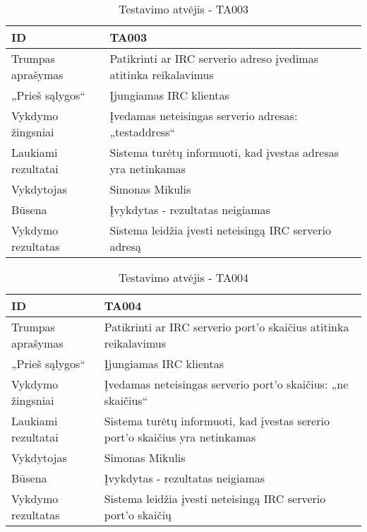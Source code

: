 \begin{table}[]
  \centering
  \label{table:TA003}
  \begin{tabular}{|l|l|}
    \hline
    ID                  & TA003                                                                         \\ \hline
    Trumpas aprašymas   & Patikrinti ar IRC serverio adreso įvedimas atitinka reikalavimus              \\ \hline
    „Prieš sąlygos“     & Įjungiamas IRC klientas                                                       \\ \hline
    Vykdymo žingsniai   & Įvedamas neteisingas serverio adresas: „testaddress“                          \\ \hline
    Laukiami rezultatai & Sistema turėtų informuoti, kad įvestas adresas yra netinkamas                 \\ \hline
    Vykdytojas          & Simonas Mikulis                                                               \\ \hline
    Būsena              & Įvykdytas - rezultatas neigiamas                                              \\ \hline
    Vykdymo rezultatas  & \cellcolor[HTML]{FF0000}Sistema leidžia įvesti neteisingą IRC serverio adresą \\ \hline
  \end{tabular}
  \caption{Testavimo atvėjis - TA003}
\end{table}

\begin{table}[]
  \centering
  \label{table:TA004}
  \begin{tabular}{|l|l|}
    \hline
    ID                  & TA004                                                                                 \\ \hline
    Trumpas aprašymas   & Patikrinti ar IRC serverio port'o skaičius atitinka reikalavimus                      \\ \hline
    „Prieš sąlygos“     & Įjungiamas IRC klientas                                                               \\ \hline
    Vykdymo žingsniai   & Įvedamas neteisingas serverio port'o skaičius: „ne skaičius“                          \\ \hline
    Laukiami rezultatai & Sistema turėtų informuoti, kad įvestas sererio port'o skaičius yra netinkamas         \\ \hline
    Vykdytojas          & Simonas Mikulis                                                                       \\ \hline
    Būsena              & Įvykdytas - rezultatas neigiamas                                                      \\ \hline
    Vykdymo rezultatas  & \cellcolor[HTML]{FF0000}Sistema leidžia įvesti neteisingą IRC serverio port'o skaičių \\ \hline
  \end{tabular}
  \caption{Testavimo atvėjis - TA004}
\end{table}

